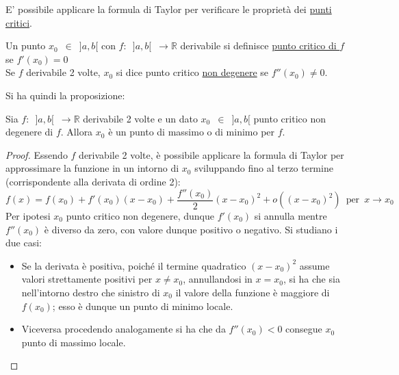 \documentclass[10pt, oneside]{book}
\theoremstyle{plain}
\begin{document}
E' possibile applicare la formula di Taylor per verificare le proprietà dei \hyperlink{critici}{punti critici}.

\begin{defin}
Un punto $x_0 \enspace \in \enspace ]a, b[$ con $f : \enspace ]a, b[ \enspace \rightarrow \mathbb{R}$ derivabile si definisce \underline{punto critico di $f$} se $f'(x_0) = 0$\\
Se $f$ derivabile 2 volte, $x_0$ si dice punto critico \underline{non degenere} se $f''(x_0) \neq 0$.
\end{defin}
Si ha quindi la proposizione:
\begin{prop}
Sia $f : \enspace ]a, b[ \enspace \rightarrow \mathbb{R}$ derivabile 2 volte e un dato $x_0 \enspace \in \enspace ]a, b[$ punto critico non degenere di $f$. Allora $x_0$ è un punto di massimo o di minimo per $f$.
\end{prop}
\begin{proof}
Essendo $f$ derivabile 2 volte, è possibile applicare la formula di Taylor per approssimare la funzione in un intorno di $x_0$ sviluppando fino al terzo termine (corrispondente alla derivata di ordine 2):
\[f(x) = f(x_0) + f'(x_0)(x-x_0) + \frac{f''(x_0)}{2}(x-x_0)^2 + o((x-x_0)^2) \enspace \textrm{per} \enspace x \rightarrow x_0\]
Per ipotesi $x_0$ punto critico non degenere, dunque $f'(x_0)$ si annulla mentre $f''(x_0)$ è diverso da zero, con valore dunque positivo o negativo. Si studiano i due casi:
\begin{itemize}[label=$\star$]
    \item Se la derivata è positiva, poiché il termine quadratico $(x-x_0)^2$ assume valori strettamente positivi per $x \neq x_0$, annullandosi in $x = x_0$, si ha che sia nell'intorno destro che sinistro di $x_0$ il valore della funzione è maggiore di $f(x_0)$; esso è dunque un punto di minimo locale.
    \item Viceversa procedendo analogamente si ha che da $f''(x_0) < 0$ consegue $x_0$ punto di massimo locale.
\end{itemize}
\end{proof}
\end{document}

